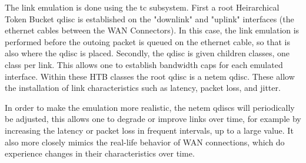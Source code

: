 The link emulation is done using the tc subsystem. First a root Heirarchical Token Bucket qdisc is established on the "downlink" and "uplink" interfaces (the ethernet cables between the WAN Connectors). In this case, the link emulation is performed before the outoing packet is queued on the ethernet cable, so that is also where the qdisc is placed. Secondly, the qdisc is given children classes, one class per link. This allows one to establish bandwidth caps for each emulated interface. Within these HTB classes the root qdisc is a netem qdisc. These allow the installation of link characteristics such as latency, packet loss, and jitter.



In order to make the emulation more realistic, the netem qdiscs will periodically be adjusted, this allows one to degrade or improve links over time, for example by increasing the latency or packet loss in frequent intervals, up to a large value. It also more closely mimics the real-life behavior of WAN connections, which do experience changes in their characteristics over time.

